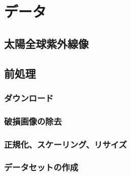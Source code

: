 \chapter{データ} 

  \section{太陽全球紫外線像}

  \section{前処理}
    \subsection{ダウンロード}
    \subsection{破損画像の除去}
    \subsection{正規化、スケーリング、リサイズ}
    \subsection{データセットの作成}



